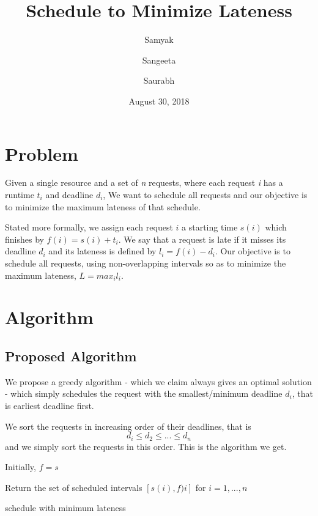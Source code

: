\documentclass{article}
\author{Samyak}
\author{Sangeeta}
\author{Saurabh}
\affil{University of Delhi}
\title{Schedule to Minimize Lateness}
\date{August 30, 2018}
\theoremstyle{definition}
\begin{document}
    
\maketitle

\section{Problem}
Given a single resource and a set of \textit{n} requests, 
where each request \textit{i} has a runtime $t_i$ and deadline
$d_i$, We want to schedule all requests and our objective is to 
minimize the maximum lateness of that schedule.

Stated more formally, we assign each request $i$ a starting time
$s(i)$ which finishes by $f(i) = s(i) + t_i$. We say that a request
is late if it misses its deadline $d_i$ and its lateness is defined
by $l_i = f(i) - d_i$. Our objective is to schedule all requests, 
using non-overlapping intervals so as to minimize the maximum lateness, 
$L = max_i l_i$.

\section{Algorithm}

\subsection{Proposed Algorithm}
We propose a greedy algorithm - which we claim always gives an optimal
solution - which simply schedules the request with the smallest/minimum
deadline $d_i$, that is earliest deadline first.

We sort the requests in increasing order of their deadlines, that is
\[ d_i \leq d_2 \leq ... \leq d_n \]
and we simply sort the requests in this order. This is the algorithm
we get.

\vspace{0.2in}

\begin{algorithm}[H]

Initially, $f = s$\;


Return the set of scheduled intervals $[s(i),f)i]$ for $i=1,...,n$
\caption{schedule with minimum lateness}
\end{algorithm}
\end{document}
